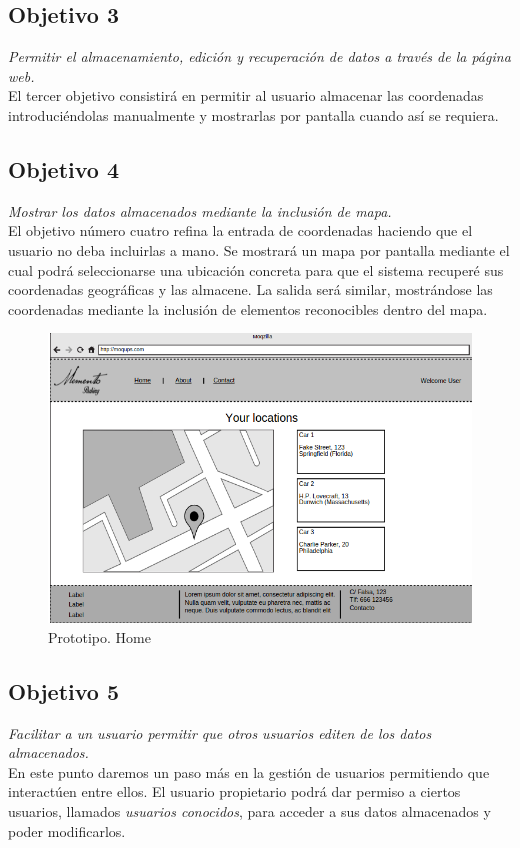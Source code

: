\subsection{Objetivo 3}
\emph{Permitir el almacenamiento, edición y recuperación de datos a través de la página web.}\\
El tercer objetivo consistirá en permitir al usuario almacenar las coordenadas introduciéndolas manualmente y mostrarlas por pantalla cuando así se requiera.

\subsection{Objetivo 4}
\emph{Mostrar los datos almacenados mediante la inclusión de mapa.}\\
El objetivo número cuatro refina la entrada de coordenadas haciendo que el usuario no deba incluirlas a mano. Se mostrará un mapa por pantalla mediante el cual podrá seleccionarse una ubicación concreta para que el sistema recuperé sus coordenadas geográficas y las almacene. La salida será similar, mostrándose las coordenadas mediante la inclusión de elementos reconocibles dentro del mapa.

\begin{figure}[hbtp]
\centering
\includegraphics[scale=0.5, fbox={\fboxrule} 4mm]{images/objetivos/prototipo_Locations.png}
\caption{Prototipo. Home}
\label{fig:prototipo_Home}
\end{figure}


\subsection{Objetivo 5}
\emph{Facilitar a un usuario permitir que otros usuarios editen de los datos almacenados.}\\
En este punto daremos un paso más en la gestión de usuarios permitiendo que interactúen entre ellos. El usuario propietario podrá dar permiso a ciertos usuarios, llamados \textit{usuarios conocidos}, para acceder a sus datos almacenados y poder modificarlos.


